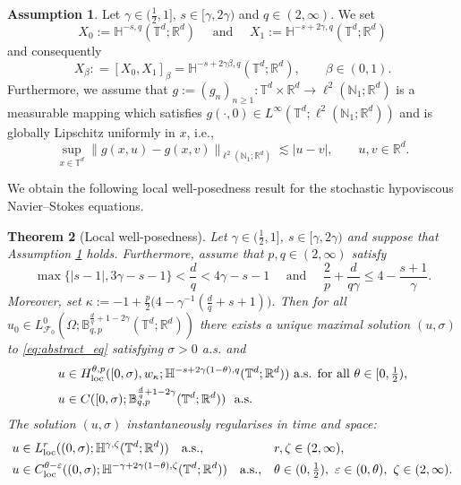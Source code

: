 \documentclass[11pt, a4paper,oneside, reqno]{amsart}
\newtheorem{theorem}{Theorem}
\theoremstyle{remark} %
\theoremstyle{definition} %
\newtheorem{assumption}[theorem]{Assumption}
\numberwithin{theorem}{section}
\numberwithin{equation}{section}
\newcommand{\Om}{\Omega}
\newcommand{\T}{\mathbb{T}}
\newcommand{\mc}{\mathcal}
\newcommand{\Hs}{\mathbb{H}}
\newcommand{\RR}{\mathbb{R}}
\newcommand{\NN}{\mathbb{N}}
\newcommand{\BB}{\mathbb{B}}
\newcommand{\RRd}{\RR^d}
\newcommand{\eps}{\varepsilon}
\newcommand{\gam}{\gamma}
\newcommand{\loc}{{\rm loc}}
\begin{document}
\begin{assumption}\label{ass:X0X1_g}
 Let $\gam\in (\frac 12,1]$, $s\in[\gam, 2\gam)$ and $q\in (2,\infty)$. We set
\begin{equation*}
    X_0:= \Hs^{-s,q}(\T^d;\RRd)\quad \text{ and }\quad X_1:=\Hs^{-s+2\gam,q}(\T^d;\RRd)
\end{equation*}
and consequently
\begin{equation*}
    X_{\beta}: =[X_0, X_1]_\beta = \Hs^{-s+2\gam\beta,q}(\T^d;\RRd),\qquad \beta\in(0,1).
\end{equation*}
Furthermore, we assume that $g:=(g_n)_{n\geq1}:\T^d\times \RR^d\to \ell^2(\NN_1; \RRd)$ is a measurable mapping which satisfies $g(\cdot, 0)\in L^\infty(\T^d;\ell^2(\NN_1;\RRd))$ and is globally Lipschitz uniformly in $x$, i.e.,
\begin{equation*}
    \sup_{x\in \T^d}\|g(x,u)-g(x,v)\|_{\ell^2(\NN_1;\RRd)}\lesssim |u-v|, \qquad u,v\in \RRd.
\end{equation*}
\end{assumption}


We obtain the following local well-posedness result for the stochastic hypoviscous Navier--Stokes equations. 


\begin{theorem}[Local well-posedness]\label{thm:localWP}
    Let $\gam \in (\frac 12, 1]$, $s\in [\gam, 2\gam)$ and suppose that Assumption \ref{ass:X0X1_g} holds. Furthermore, assume that $p,q\in (2,\infty)$ satisfy
        \begin{equation*}
        \max\{|s-1|, 3\gam-s-1\}<\frac dq < 4\gam-s-1\quad \text{ and }\quad \frac{2}{p}+\frac{d}{q\gam}\leq 4-\frac{s+1}{\gam}.
    \end{equation*}
    Moreover, set $\kappa:=-1 + \frac{p}{2}\big(4-\gam^{-1}(\frac{d}{q}+s+1)\big)$. Then for all $u_0 \in L^0_{\mc{F}_0}(\Om; \BB_{q,p}^{\frac{d}{q}+1-2\gam}(\T^d;\RRd))$ there exists a unique maximal solution $(u,\sigma)$ to \eqref{eq:abstract_eq} satisfying $\sigma>0$ a.s. and
    \begin{align*}
        u&\in H^{\theta,p}_{\loc}([0,\sigma),w_{\kappa}; \Hs^{-s+2\gam(1-\theta),q}(\T^d; \RRd)) \,\,\text{a.s. for all }\theta\in [0,\tfrac 12),\\
        u&\in C([0, \sigma); \BB_{q,p}^{\frac{d}{q}+1-2\gam}(\T^d; \RRd))\,\, \text{ a.s.}
    \end{align*}
    The solution $(u,\sigma)$ instantaneously regularises in time and space:
\begin{align*}
u&\in L^r_\loc((0,\sigma);\Hs^{\gam,\zeta}(\T^d;\RRd))
\quad\text{a.s.}, &&r,\zeta\in(2,\infty),\\
u&\in C^{\theta-\eps}_\loc((0,\sigma);
\Hs^{-\gam+2\gam(1-\theta),\zeta}(\T^d;\RRd))
\quad\text{a.s.}, &&
\theta\in(0,\tfrac 12),\ \eps\in(0,\theta),\ \zeta\in(2,\infty).
\end{align*}
\end{theorem}
\end{document}
